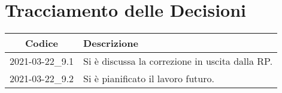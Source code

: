 \section*{Tracciamento delle Decisioni}

\begin{center}
	\begin{longtable}{|c|p{13cm}|}
	\hline
	\rowcolor{lighter-grayer}
	\textbf{Codice} & \textbf{Descrizione} \\
	\hline
	\endfirsthead

	
	
	2021-03-22\_9.1 & Si è discussa la correzione in uscita dalla RP.  \\
	\hline
	2021-03-22\_9.2 & Si è pianificato il lavoro futuro.  \\
	\hline
	

	\end{longtable}
\end{center}

